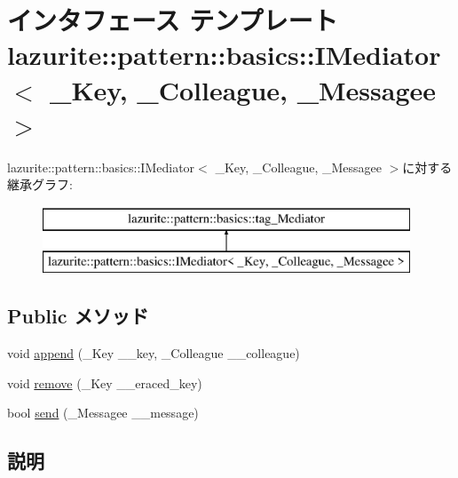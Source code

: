 \hypertarget{interfacelazurite_1_1pattern_1_1basics_1_1_i_mediator_3_01___key_00_01___colleague_00_01___messagee_01_4}{
\section{インタフェース テンプレート lazurite::pattern::basics::IMediator$<$ \_\-Key, \_\-Colleague, \_\-Messagee $>$}
\label{interfacelazurite_1_1pattern_1_1basics_1_1_i_mediator_3_01___key_00_01___colleague_00_01___messagee_01_4}
}
lazurite::pattern::basics::IMediator$<$ \_\-Key, \_\-Colleague, \_\-Messagee $>$に対する継承グラフ:\begin{figure}[H]
\begin{center}
\leavevmode
\includegraphics[height=2cm]{interfacelazurite_1_1pattern_1_1basics_1_1_i_mediator_3_01___key_00_01___colleague_00_01___messagee_01_4}
\end{center}
\end{figure}
\subsection*{Public メソッド}
\begin{DoxyCompactItemize}
\item 
void \hyperlink{interfacelazurite_1_1pattern_1_1basics_1_1_i_mediator_3_01___key_00_01___colleague_00_01___messagee_01_4_ae2b6ff4e0bf6be0986b40bd280d6a235}{append} (\_\-Key \_\-\_\-key, \_\-Colleague \_\-\_\-colleague)
\item 
void \hyperlink{interfacelazurite_1_1pattern_1_1basics_1_1_i_mediator_3_01___key_00_01___colleague_00_01___messagee_01_4_aa01f948777b7760509569a435e1194cb}{remove} (\_\-Key \_\-\_\-eraced\_\-key)
\item 
bool \hyperlink{interfacelazurite_1_1pattern_1_1basics_1_1_i_mediator_3_01___key_00_01___colleague_00_01___messagee_01_4_afa531f2cede26ca58e499c83edf7ffdb}{send} (\_\-Messagee \_\-\_\-message)
\end{DoxyCompactItemize}


\subsection{説明}
